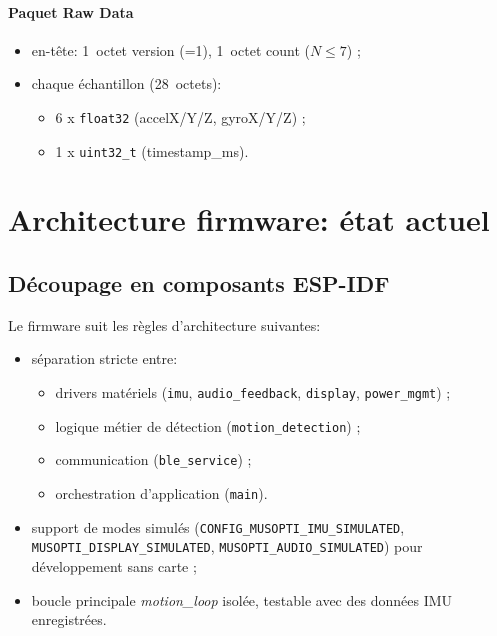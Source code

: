 \documentclass[a4paper,11pt]{article}
\begin{document}
\paragraph{Paquet Raw Data}
\begin{itemize}
  \item en-tête: 1~octet version (=1), 1~octet count ($N \leq 7$) ;
  \item chaque échantillon (28~octets):
  \begin{itemize}[nosep]
    \item 6 x \texttt{float32} (accelX/Y/Z, gyroX/Y/Z) ;
    \item 1 x \texttt{uint32\_t} (timestamp\_ms).
  \end{itemize}
\end{itemize}

\section{Architecture firmware: état actuel}

\subsection{Découpage en composants ESP-IDF}

Le firmware suit les règles d'architecture suivantes:
\begin{itemize}
  \item séparation stricte entre:
  \begin{itemize}
    \item drivers matériels (\texttt{imu}, \texttt{audio\_feedback}, \texttt{display}, \texttt{power\_mgmt}) ;
    \item logique métier de détection (\texttt{motion\_detection}) ;
    \item communication (\texttt{ble\_service}) ;
    \item orchestration d'application (\texttt{main}).
  \end{itemize}
  \item support de modes simulés (\texttt{CONFIG\_MUSOPTI\_IMU\_SIMULATED}, \texttt{MUSOPTI\_DISPLAY\_SIMULATED}, \texttt{MUSOPTI\_AUDIO\_SIMULATED}) pour développement sans carte ;
  \item boucle principale \emph{motion\_loop} isolée, testable avec des données IMU enregistrées.
\end{itemize}
\end{document}
